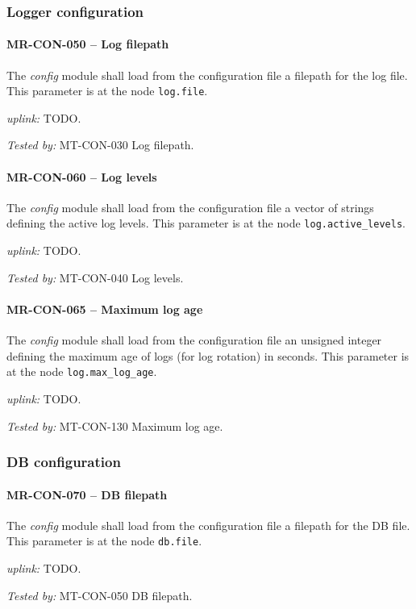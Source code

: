 \subsubsection{Logger configuration}
\paragraph{MR-CON-050 -- Log filepath}
The \emph{config} module shall load from the configuration file a filepath
for the log file. This parameter is at the node \lstinline{log.file}.

\textit{uplink: } TODO.

\textit{Tested by: } MT-CON-030 Log filepath.

\paragraph{MR-CON-060 -- Log levels}
The \emph{config} module shall load from the configuration file a vector of
strings defining the active log levels. This parameter is at the node
\lstinline{log.active_levels}.

\textit{uplink: } TODO.

\textit{Tested by: } MT-CON-040 Log levels.

\paragraph{MR-CON-065 -- Maximum log age}
The \emph{config} module shall load from the configuration file an
unsigned integer defining the maximum age of logs (for log rotation)
in seconds. This parameter is at the node \lstinline{log.max_log_age}.

\textit{uplink: } TODO.

\textit{Tested by: } MT-CON-130 Maximum log age.

\subsubsection{DB configuration}
\paragraph{MR-CON-070 -- DB filepath}
The \emph{config} module shall load from the configuration file a filepath
for the DB file. This parameter is at the node \lstinline{db.file}.

\textit{uplink: } TODO.

\textit{Tested by: } MT-CON-050 DB filepath.

